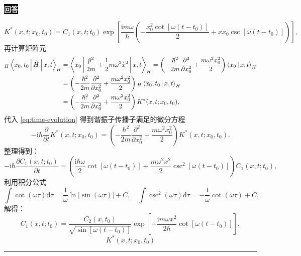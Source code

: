 \documentclass[11pt,a4paper]{ctexart}
\newenvironment{answer}
  {\par\smallskip\noindent
   \begingroup
   \setlength{\fboxsep}{4pt}%
   \colorbox{black}{\textcolor{white}{\bfseries 回答}}%
   \endgroup
   \quad\ignorespaces}
  {\par\smallskip\noindent\rule{\linewidth}{0.4pt}\medskip}
\begin{document}
\begin{answer}
\begin{enumerate}
\begin{equation}
      K^*(x,t;x_0,t_0)
      =C_1(x,t;t_0) \exp\left[\frac{\mathrm{i}m\omega }{\hbar } \left(-\frac{x_0^2 \cot\left[\omega(t-t_0) \right] }{2 } + x x_0 \csc\left[\omega(t-t_0) \right] \right) \right],
    \end{equation}
    再计算矩阵元
    \begin{equation}
      \begin{aligned}
        {}_H\Braket{x_0,t_0|\hat{H}|x,t }_H
        &=\Braket{x_0|\frac{\hat{p}^2 }{2m } + \frac{1 }{2 } m\omega^2\hat{x}^2 |x,t }_H
        =\left(-\frac{\hbar^2 }{2m }\frac{\partial^2 }{\partial x_0^2 } + \frac{m\omega^2 x_0^2 }{2 } \right) \Braket{x_0|x,t }_H \\
        &=\left(-\frac{\hbar^2 }{2m }\frac{\partial^2 }{\partial x_0^2 } + \frac{m\omega^2 x_0^2 }{2 } \right) {}_H\Braket{x_0,t_0|x,t }_{H} \\
        &=\left(-\frac{\hbar^2 }{2m }\frac{\partial^2 }{\partial x_0^2 } + \frac{m\omega^2 x_0^2 }{2 } \right) K^*(x,t;x_0,t_0),
      \end{aligned}
    \end{equation}
    代入 \eqref{eq:time-evolution} 得到谐振子传播子满足的微分方程
    \begin{equation}
      -\mathrm{i}\hbar\frac{\partial }{\partial t}K^*(x,t;x_0,t_0)
      =\left(-\frac{\hbar^2 }{2m }\frac{\partial^2 }{\partial x_0^2 } + \frac{m\omega^2 x_0^2 }{2 } \right) K^*(x,t;x_0,t_0).
    \end{equation}
    整理得到：
    \begin{equation}
      -\mathrm{i}\hbar \frac{\partial C_1(x,t;t_0) }{\partial t }
      =\left(\frac{\mathrm{i}\hbar\omega }{2 } \cot\left[\omega(t-t_0) \right] + \frac{m\omega^2 x^2 }{2 }\csc^2\left[\omega(t-t_0) \right]  \right) C_1(x,t;t_0), 
    \end{equation}
    利用积分公式
    \begin{equation}
      \int \cot(\omega\tau) \mathrm{d}\tau 
      = \frac{1 }{\omega } \ln\left|\sin(\omega\tau) \right|+C,\quad
      \int \csc^2(\omega\tau)\mathrm{d}\tau
      =-\frac{1 }{\omega } \cot(\omega\tau) + C,
    \end{equation}
    解得：
    \begin{equation}
      C_1(x,t;t_0)
      =\frac{C_2(x,t_0) }{\sqrt{\sin\left[\omega(t-t_0) \right]} } \exp\left[-\frac{\mathrm{i}m\omega x^2 }{2\hbar } \cot\left[\omega(t-t_0) \right] \right],
    \end{equation}
    \begin{equation}
      K^*(x,t;x_0,t_0)

\end{equation}
\end{enumerate}
\end{answer}
\end{document}
